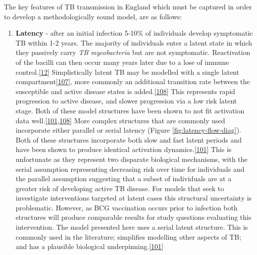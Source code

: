 \documentclass[11pt,twoside]{bristolthesis}
\providecommand{\tightlist}{%
  \setlength{\itemsep}{0pt}\setlength{\parskip}{0pt}}
\begin{document}
  The key features of TB transmission in England which must be captured in order to develop a methodologically sound model, are as follows:
  \begin{enumerate}
  \def\labelenumi{\arabic{enumi}.}
  \tightlist
  \item
    \textbf{Latency} - after an initial infection 5-10\% of individuals develop symptomatic TB within 1-2 years. The majority of individuals enter a latent state in which they passively carry \emph{TB mycobacteria} but are not symptomatic. Reactivation of the bacilli can then occur many years later due to a lose of immune control.{[}\protect\hyperlink{ref-Gideon2011a}{12}{]} Simplistically latent TB may be modelled with a single latent compartment{[}\protect\hyperlink{ref-Brooks-Pollock2010a}{107}{]}, more commonly an additional transition rate between the susceptible and active disease states is added.{[}\protect\hyperlink{ref-Menzies2018}{108}{]} This represents rapid progression to active disease, and slower progression via a low risk latent stage. Both of these model structures have been shown to not fit activation data well.{[}\protect\hyperlink{ref-Ragonnet2017}{101},\protect\hyperlink{ref-Menzies2018}{108}{]} More complex structures that are commonly used incorporate either parallel or serial latency (Figure \ref{fig:latency-flow-diag}). Both of these structures incorporate both slow and fast latent periods and have been shown to produce identical activation dynamics.{[}\protect\hyperlink{ref-Ragonnet2017}{101}{]} This is unfortunate as they represent two disparate biological mechanisms, with the serial assumption representing decreasing risk over time for individuals and the parallel assumption suggesting that a subset of individuals are at a greater risk of developing active TB disease. For models that seek to investigate interventions targeted at latent cases this structural uncertainty is problematic. However, as BCG vaccination occurs prior to infection both structures will produce comparable results for study questions evaluating this intervention. The model presented here uses a serial latent structure. This is commonly used in the literature; simplifies modelling other aspects of TB; and has a plausible biological underpinning.{[}\protect\hyperlink{ref-Ragonnet2017}{101}{]}
  \end{enumerate}
  \newpage
\end{document}
